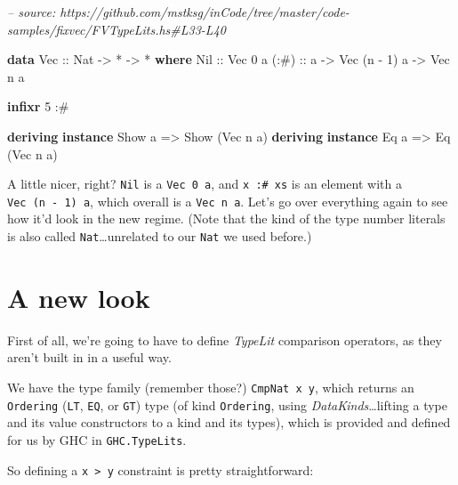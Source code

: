 \documentclass[]{article}
\newenvironment{Shaded}{}{}
\newcommand{\CommentTok}[1]{\textcolor[rgb]{0.38,0.63,0.69}{\textit{#1}}}
\newcommand{\DataTypeTok}[1]{\textcolor[rgb]{0.56,0.13,0.00}{#1}}
\newcommand{\DecValTok}[1]{\textcolor[rgb]{0.25,0.63,0.44}{#1}}
\newcommand{\FunctionTok}[1]{\textcolor[rgb]{0.02,0.16,0.49}{#1}}
\newcommand{\KeywordTok}[1]{\textcolor[rgb]{0.00,0.44,0.13}{\textbf{#1}}}
\newcommand{\NormalTok}[1]{#1}
\newcommand{\OtherTok}[1]{\textcolor[rgb]{0.00,0.44,0.13}{#1}}
\begin{document}
\begin{Shaded}
\begin{Highlighting}[]
\CommentTok{-- source: https://github.com/mstksg/inCode/tree/master/code-samples/fixvec/FVTypeLits.hs#L33-L40}

\KeywordTok{data} \DataTypeTok{Vec}\OtherTok{ ::} \DataTypeTok{Nat} \OtherTok{->} \FunctionTok{*} \OtherTok{->} \FunctionTok{*} \KeywordTok{where}
    \DataTypeTok{Nil}\OtherTok{  ::} \DataTypeTok{Vec} \DecValTok{0}\NormalTok{ a}
\OtherTok{    (:#) ::}\NormalTok{ a }\OtherTok{->} \DataTypeTok{Vec}\NormalTok{ (n }\FunctionTok{-} \DecValTok{1}\NormalTok{) a }\OtherTok{->} \DataTypeTok{Vec}\NormalTok{ n a}

\KeywordTok{infixr} \DecValTok{5} \FunctionTok{:#}

\KeywordTok{deriving} \KeywordTok{instance} \DataTypeTok{Show}\NormalTok{ a }\OtherTok{=>} \DataTypeTok{Show}\NormalTok{ (}\DataTypeTok{Vec}\NormalTok{ n a)}
\KeywordTok{deriving} \KeywordTok{instance} \DataTypeTok{Eq}\NormalTok{ a }\OtherTok{=>} \DataTypeTok{Eq}\NormalTok{ (}\DataTypeTok{Vec}\NormalTok{ n a)}
\end{Highlighting}
\end{Shaded}

A little nicer, right? \texttt{Nil} is a \texttt{Vec\ 0\ a}, and
\texttt{x\ :\#\ xs} is an element with a \texttt{Vec\ (n\ -\ 1)\ a}, which
overall is a \texttt{Vec\ n\ a}. Let's go over everything again to see how it'd
look in the new regime. (Note that the kind of the type number literals is also
called \texttt{Nat}\ldots{}unrelated to our \texttt{Nat} we used before.)

\hypertarget{a-new-look}{%
\section{A new look}\label{a-new-look}}

First of all, we're going to have to define \emph{TypeLit} comparison operators,
as they aren't built in in a useful way.

We have the type family (remember those?) \texttt{CmpNat\ x\ y}, which returns
an \texttt{Ordering} (\texttt{LT}, \texttt{EQ}, or \texttt{GT}) type (of kind
\texttt{Ordering}, using \emph{DataKinds}\ldots{}lifting a type and its value
constructors to a kind and its types), which is provided and defined for us by
GHC in \texttt{GHC.TypeLits}.

So defining a \texttt{x\ \textgreater{}\ y} constraint is pretty
straightforward:
\end{document}
